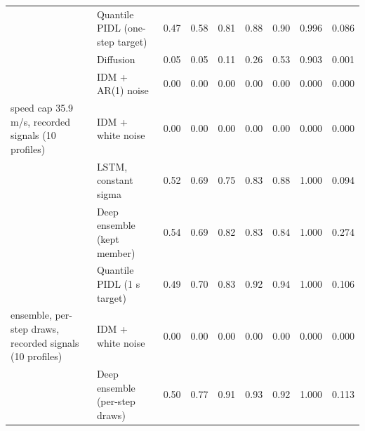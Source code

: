 \begin{longtable}{llrrrrrrr}
 & Quantile PIDL (one-step target) & 0.47 & 0.58 & 0.81 & 0.88 & 0.90 & 0.996 & 0.086 \\
 & Diffusion & 0.05 & 0.05 & 0.11 & 0.26 & 0.53 & 0.903 & 0.001 \\
 & IDM + AR(1) noise & 0.00 & 0.00 & 0.00 & 0.00 & 0.00 & 0.000 & 0.000 \\
\midrule
speed cap 35.9 m/s, recorded signals (10 profiles) & IDM + white noise & 0.00 & 0.00 & 0.00 & 0.00 & 0.00 & 0.000 & 0.000 \\
 & LSTM, constant sigma & 0.52 & 0.69 & 0.75 & 0.83 & 0.88 & 1.000 & 0.094 \\
 & Deep ensemble (kept member) & 0.54 & 0.69 & 0.82 & 0.83 & 0.84 & 1.000 & 0.274 \\
 & Quantile PIDL (1 s target) & 0.49 & 0.70 & 0.83 & 0.92 & 0.94 & 1.000 & 0.106 \\
\midrule
ensemble, per-step draws, recorded signals (10 profiles) & IDM + white noise & 0.00 & 0.00 & 0.00 & 0.00 & 0.00 & 0.000 & 0.000 \\
 & Deep ensemble (per-step draws) & 0.50 & 0.77 & 0.91 & 0.93 & 0.92 & 1.000 & 0.113 \\
\end{longtable}
\endgroup
